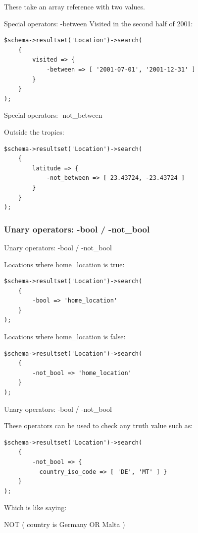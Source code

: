 These take an array reference with two values.

\begin{frame}[fragile]{Special operators: -between}
Visited in the second half of 2001:

\begin{lstlisting}
$schema->resultset('Location')->search(
    {
        visited => {
            -between => [ '2001-07-01', '2001-12-31' ]
        }
    }
);
\end{lstlisting}
\end{frame}

\begin{frame}[fragile]{Special operators: -not\_between}

Outside the tropics:

\begin{lstlisting}
$schema->resultset('Location')->search(
    {
        latitude => {
            -not_between => [ 23.43724, -23.43724 ]
        }
    }
);
\end{lstlisting}
\end{frame}

\subsubsection{Unary operators: -bool / -not\_bool}

\begin{frame}[fragile]{Unary operators: -bool / -not\_bool}

Locations where home\_location is true:

\begin{lstlisting}
$schema->resultset('Location')->search(
    {
        -bool => 'home_location'
    }
);
\end{lstlisting}

Locations where home\_location is false:

\begin{lstlisting}
$schema->resultset('Location')->search(
    {
        -not_bool => 'home_location'
    }
);
\end{lstlisting}
\end{frame}

\begin{frame}[fragile]{Unary operators: -bool / -not\_bool}

These operators can be used to check any truth value such as:

\begin{lstlisting}
$schema->resultset('Location')->search(
    {
        -not_bool => { 
          country_iso_code => [ 'DE', 'MT' ] }
    }
);
\end{lstlisting}

Which is like saying:

NOT ( country is Germany OR Malta )
\end{frame}

